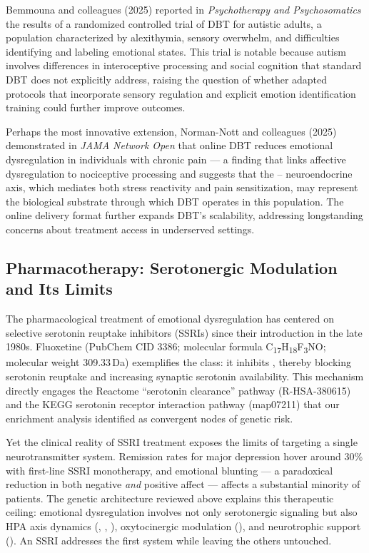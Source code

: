 Bemmouna and colleagues (2025) reported in \emph{Psychotherapy and
Psychosomatics} the results of a randomized controlled trial of DBT for
autistic adults, a population characterized by alexithymia, sensory
overwhelm, and difficulties identifying and labeling emotional
states.\cite{bemmouna2025}
This trial is notable because autism involves differences in interoceptive
processing and social cognition that standard DBT does not explicitly address,
raising the question of whether adapted protocols that incorporate sensory
regulation and explicit emotion identification training could further improve
outcomes.

Perhaps the most innovative extension, Norman-Nott and colleagues (2025)
demonstrated in \emph{JAMA Network Open} that online DBT reduces emotional
dysregulation in individuals with chronic pain — a finding that links affective
dysregulation to nociceptive processing and suggests that the
-- neuroendocrine axis, which mediates both stress
reactivity and pain sensitization, may represent the biological substrate
through which DBT operates in this population.\cite{normannott2025}
The online delivery format further expands DBT's scalability, addressing
longstanding concerns about treatment access in underserved settings.

\subsection*{Pharmacotherapy: Serotonergic Modulation and Its Limits}

The pharmacological treatment of emotional dysregulation has centered on
selective serotonin reuptake inhibitors (SSRIs) since their introduction in
the late 1980s.\cite{linehan1993}
Fluoxetine (PubChem CID 3386; molecular formula C\textsubscript{17}H\textsubscript{18}F\textsubscript{3}NO;
molecular weight 309.33\,Da) exemplifies the class: it inhibits ,
thereby blocking serotonin reuptake and increasing synaptic serotonin
availability.\cite{kim2023}
This mechanism directly engages the Reactome ``serotonin clearance'' pathway
(R-HSA-380615) and the KEGG serotonin receptor interaction pathway (map07211)
that our enrichment analysis identified as convergent nodes of genetic risk.

Yet the clinical reality of SSRI treatment exposes the limits of targeting a
single neurotransmitter system.
Remission rates for major depression hover around 30\% with first-line SSRI
monotherapy, and emotional blunting — a paradoxical reduction in both negative
\emph{and} positive affect — affects a substantial minority of
patients.\cite{pizzagalli2021}
The genetic architecture reviewed above explains this therapeutic ceiling:
emotional dysregulation involves not only serotonergic signaling but also
HPA axis dynamics (, , ), oxytocinergic
modulation (), and neurotrophic support ().
An SSRI addresses the first system while leaving the others untouched.

